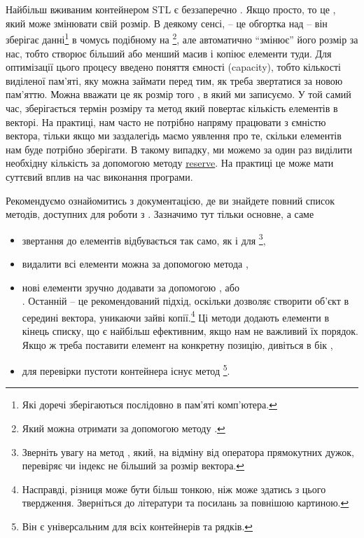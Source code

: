 \documentclass[12pt]{article}
\begin{document}
	\section{}
	Найбільш вживаним контейнером STL є беззаперечно \href{https://en.cppreference.com/w/cpp/container/vector}{}. Якщо просто, то це , який може змінювати свій розмір. В деякому сенсі,  -- це обгортка над  -- він зберігає данні\footnote{Які доречі зберігаються послідовно в пам'яті комп'ютера.} в чомусь подібному на \footnote{Який можна отримати за допомогою методу .}, але автоматично ``змінює'' його розмір за нас, тобто створює більший або менший масив і копіює елементи туди. Для оптимізації цього процесу введено поняття ємності (capacity), тобто кількості виділеної пам'яті, яку можна займати перед тим, як треба звертатися за новою пам'яттю. Можна вважати це як розмір того , в який ми записуємо. У той самий час, зберігається термін розміру та метод  який повертає кількість елементів в векторі. На практиці, нам часто не потрібно напряму працювати з ємністю вектора, тільки якщо ми заздалегідь маємо уявлення про те, скільки елементів нам буде потрібно зберігати. В такому випадку, ми можемо за один раз виділити необхідну кількість за допомогою методу \href{https://en.cppreference.com/w/cpp/container/vector/reserve}{reserve}. На практиці це може мати суттєвий вплив на час виконання програми.

	Рекомендуємо ознайомитись з документацією, де ви знайдете повний список методів, доступних для роботи з . Зазначимо тут тільки основне, а саме
	\begin{itemize}
		\item звертання до елементів відбувається так само, як і для \footnote{Зверніть увагу на метод , який, на відміну від оператора прямокутних дужок, перевіряє чи індекс не більший за розмір вектора.},
		\item видалити всі елементи можна за допомогою метода ,
		\item нові елементи зручно додавати за допомогою \href{https://en.cppreference.com/w/cpp/container/vector/push_back}{}, або \\ \href{https://en.cppreference.com/w/cpp/container/vector/emplace_back}{}. Останній -- це рекомендований підхід, оскільки дозволяє створити об'єкт в середині вектора, уникаючи зайві копії.\footnote{Насправді, різниця може бути більш тонкою, ніж може здатись з цього твердження. Зверніться до літератури та посилань за повнішою картиною.} Ці методи додають елементи в кінець списку, що є найбільш ефективним, якщо нам не важливий їх порядок. Якщо ж треба поставити елемент на конкретну позицію, дивіться в бік \href{https://en.cppreference.com/w/cpp/container/vector/insert}{},
		\item для перевірки пустоти контейнера існує метод \footnote{Він є універсальним для всіх контейнерів та рядків.}.
	\end{itemize}
\end{document}
